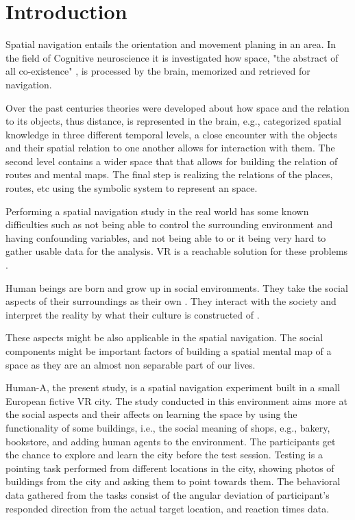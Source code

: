 \chapter{Introduction}

Spatial navigation entails the orientation and movement planing in an area. In the field of Cognitive neuroscience it is investigated how space, "the abstract of all co-existence" \autocite{spencer1989}, is processed by the brain, memorized and retrieved for navigation. 

Over the past centuries theories were developed about how space and the relation to its objects, thus distance, is represented in the brain, e.g., \textcite{cassirer1955philosophy} categorized spatial knowledge in three different temporal levels, a close encounter with the objects and their spatial relation to one another allows for interaction with them. The second level contains a wider space that that allows for building the relation of routes and mental maps. The final step is realizing the relations of the places, routes, etc using the symbolic system to represent an space. 

Performing a spatial navigation study in the real world has some known difficulties such as not being able to control the surrounding environment and having confounding variables, and not being able to or it being very hard to gather usable data for the analysis. VR is a reachable solution for these problems \autocite{diersch2019potential}. 

Human beings are born and grow up in social environments. They take the social aspects of their surroundings as their own \autocite{berger1967luckman}. They interact with the society and interpret the reality by what their culture is constructed of \autocite{SIEGEL19759}. 

These aspects might be also applicable in the spatial navigation. The social components might be important factors of building a spatial mental map of a space as they are an almost non separable part of our lives. 

Human-A, the present study, is a spatial navigation experiment built in a small European fictive VR city. The study conducted in this environment aims more at the social aspects and their affects on learning the space by using the functionality of some buildings, i.e., the social meaning of shops, e.g., bakery, bookstore, and adding human agents to the environment. The participants get the chance to explore and learn the city before the test session. Testing is a pointing task performed from different locations in the city, showing photos of buildings from the city and asking them to point towards them. The behavioral data gathered from the tasks consist of the angular deviation of participant's responded direction from the actual target location, and reaction times data.

